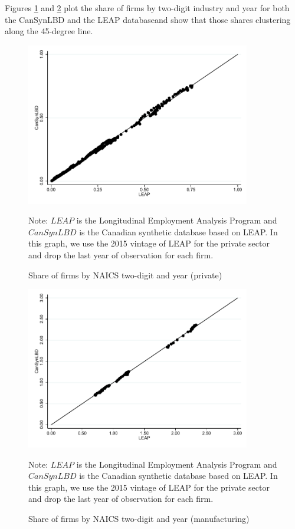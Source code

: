 \documentclass{article}
\begin{document}
Figures \ref{FirmSharePrivate} and \ref{FirmShareManufacturing} plot the share of firms by two-digit industry and year for both the CanSynLBD and the LEAP databaseand show that those shares clustering along the 45-degree line.

\begin{figure} [H]
\centering
\caption{Share of firms by NAICS two-digit and year (private)} \label{FirmSharePrivate}
\includegraphics[height=2.8in, width=.7\linewidth]{graphs/Share_of_firms_by_NAICS_two-digit_and_year_private_bw.pdf} 
\begin{minipage}{0.85\textwidth}
{\footnotesize Note: $LEAP$ is the Longitudinal Employment Analysis Program and $CanSynLBD$ is the Canadian synthetic database based on LEAP. In this graph, we use the 2015 vintage of LEAP for the private sector and drop the last year of observation for each firm. \par}
\end{minipage}
\end{figure}


\vspace{-15.5pt}
\begin{figure} [H]
\centering
\caption{Share of firms by NAICS two-digit and year (manufacturing)} \label{FirmShareManufacturing}
\includegraphics[height=2.8in, width=.7\linewidth]{graphs/Share_of_firms_by_NAICS_two-digit_and_year_Manufacturing_bw.pdf} 
\begin{minipage}{0.85\textwidth}
{\footnotesize Note: $LEAP$ is the Longitudinal Employment Analysis Program and $CanSynLBD$ is the Canadian synthetic database based on LEAP. In this graph, we use the 2015 vintage of LEAP for the private sector and drop the last year of observation for each firm. \par}
\end{minipage}
\end{figure}
\end{document}
